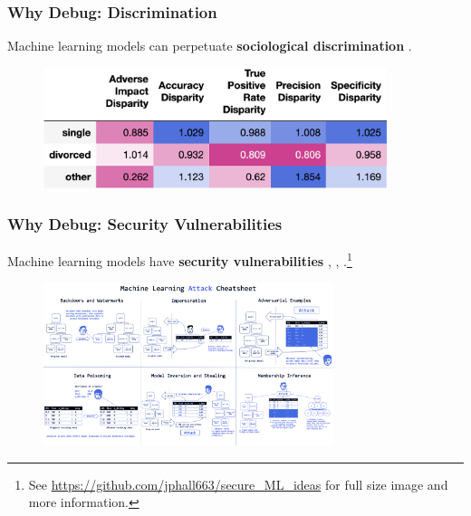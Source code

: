 \documentclass[11pt,
               aspectratio=169,
               hyperref={colorlinks}
               ]{beamer}
\begin{document}
			\begin{frame}[label={slide:disp}]
		
				\frametitle{Why Debug: Discrimination}
		
				\footnotesize{Machine learning models can perpetuate \textbf{sociological discrimination} \cite{barocas-hardt-narayanan}.}
				\vspace{10pt}	
				\begin{figure}
					\begin{center}
						\includegraphics[height=100pt]{../img/di.png}
					\end{center}
				\end{figure}
				\normalsize
		
			\end{frame}
		
			\begin{frame}[t]
		
				\frametitle{Why Debug: Security Vulnerabilities}
		
				\footnotesize{Machine learning models have \textbf{security vulnerabilities} \cite{security_of_ml}, \cite{membership_inference}, \cite{model_stealing}}.\footnote{\tiny{See \url{https://github.com/jphall663/secure_ML_ideas} for full size image and more information.}}
				\begin{figure}[]
					\begin{center}
						\includegraphics[height=135pt]{../img/cheatsheet_blue.png}
					\end{center}
				\end{figure}	
				\vspace{-17pt}
				\normalsize
		
			\end{frame}
\end{document}
